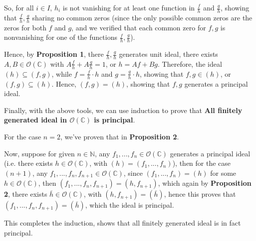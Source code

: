 \documentclass{article}
\begin{document}
\begin{itemize}
    So, for all $i\in I$, $h_i$ is not vanishing for at least one function in $\frac{f}{h}$ and $\frac{g}{h}$, showing that $\frac{f}{h},\frac{g}{h}$ sharing no common zeros (since the only possible common zeros are the zeros for both $f$ and $g$, and we verified that each common zero for $f,g$ is nonvanishing for one of the functions $\frac{f}{h},\frac{g}{h}$).
    
    Hence, by \textbf{Proposition 1}, there $\frac{f}{h},\frac{g}{h}$ generates unit ideal, there exists $A,B\in\mathcal{O}(\mathbb{C})$ with $A\frac{f}{h}+A\frac{g}{h}=1$, or $h=Af+Bg$.
    Therefore, the ideal $(h)\subseteq(f,g)$, while $f=\frac{f}{h}\cdot h$ and $g=\frac{g}{h}\cdot h$, showing that $f,g\in (h)$, or $(f,g)\subseteq (h)$.
    Hence, $(f,g)=(h)$, showing that $f,g$ generates a principal ideal.

    \hfil

    Finally, with the above tools, we can use induction to prove that \textbf{All finitely generated ideal in $\mathcal{O}(\mathbb{C})$ is principal}.

    For the case $n=2$, we've proven that in \textbf{Proposition 2}.

    Now, suppose for given $n\in\mathbb{N}$, any $f_1,...,f_n\in\mathcal{O}(\mathbb{C})$ generates a principal ideal (i.e. there exists $h\in\mathcal{O}(\mathbb{C})$, with $(h)=(f_1,...,f_n)$),
    then for the case $(n+1)$, any $f_1,...,f_n,f_{n+1}\in\mathcal{O}(\mathbb{C})$, since $(f_1,...,f_n)=(h)$ for some $h\in\mathcal{O}(\mathbb{C})$, then $(f_1,...,f_n,f_{n+1})=(h,f_{n+1})$,
    which again by \textbf{Proposition 2}, there exists $\bar{h}\in\mathcal{O}(\mathbb{C})$, with $(h,f_{n+1})=(\bar{h})$, hence this proves that $(f_1,...,f_n,f_{n+1})=(\bar{h})$, which the ideal is principal.
    
    This completes the induction, shows that all finitely generated ideal is in fact principal.
\end{itemize}
\end{document}
